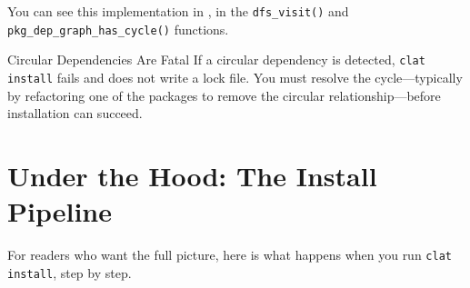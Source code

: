 You can see this implementation in , in the \lstinline|dfs_visit()| and \lstinline|pkg_dep_graph_has_cycle()| functions.

\begin{warnbox}{Circular Dependencies Are Fatal}
If a circular dependency is detected, \texttt{clat install} fails and does not write a lock file.
You must resolve the cycle---typically by refactoring one of the packages to remove the circular relationship---before installation can succeed.
\end{warnbox}

\section{Under the Hood: The Install Pipeline}\label{sec:install-pipeline}

For readers who want the full picture, here is what happens when you run \texttt{clat install}, step by step.

